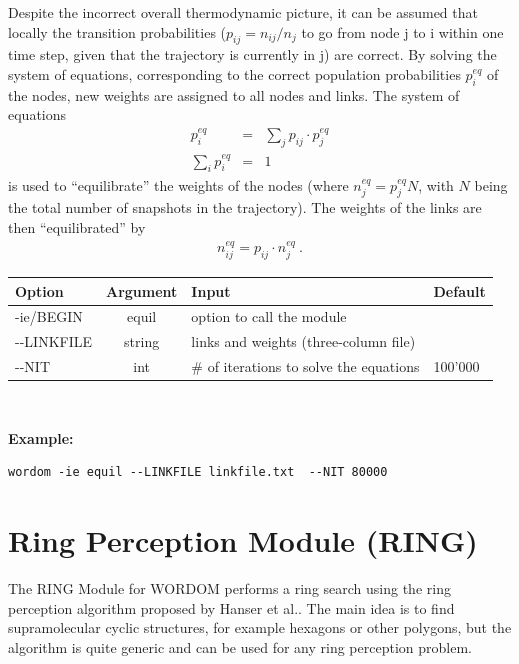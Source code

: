 \documentclass[11pt,twoside,onecolumn,a4paper,openright,notitlepage]{book}[2001/04/21]
\begin{document}
Despite the incorrect overall thermodynamic picture, it can be assumed that locally the transition probabilities ($p_{ij}=n_{ij}/n_{j}$ to go from node j to i within one time step, given that the trajectory is currently in j) are correct. By solving the system of equations, corresponding to the correct population probabilities $p_{i}^{eq}$ of the nodes, new weights are assigned to all nodes and links.
The system of equations
%
\begin{eqnarray*}
p_i^{eq} &=& \sum_{j}{p_{ij}} \cdot p_j^{eq} \\ 
\sum_{i} {p_i^{eq}}& =&1
\end{eqnarray*}
is used to ``equilibrate'' the weights of the nodes (where $n_j^{eq}=p_j^{eq} N$, with $N$ being the total number of snapshots in the trajectory).
%
The weights of the links are then ``equilibrated'' by
%
\begin{eqnarray*}
n_{ij}^{eq}=p_{ij}\cdot n_j^{eq} \ .
\end{eqnarray*} 
%

\begin{tabular}{l|c|l|l}
Option & Argument & Input & Default \\
\hline
-ie/BEGIN    & equil & option to call the module\\
-{}-LINKFILE & string & links and weights (three-column file) \\
-{}-NIT      & int    & \# of iterations to solve the equations & 100'000\\
\end{tabular}\\\vspace{5mm}


{\bf Example:}

\begin{verbatim}wordom -ie equil --LINKFILE linkfile.txt  --NIT 80000 \end{verbatim}

\clearpage

\section{Ring Perception Module (RING)}

The RING Module for WORDOM performs a ring search using the ring perception algorithm proposed by Hanser et al.\cite{hanser}. The main idea is to find supramolecular cyclic structures, for example hexagons or other polygons, but the algorithm is quite generic and can be used for any ring perception problem. 
	
\end{document}
